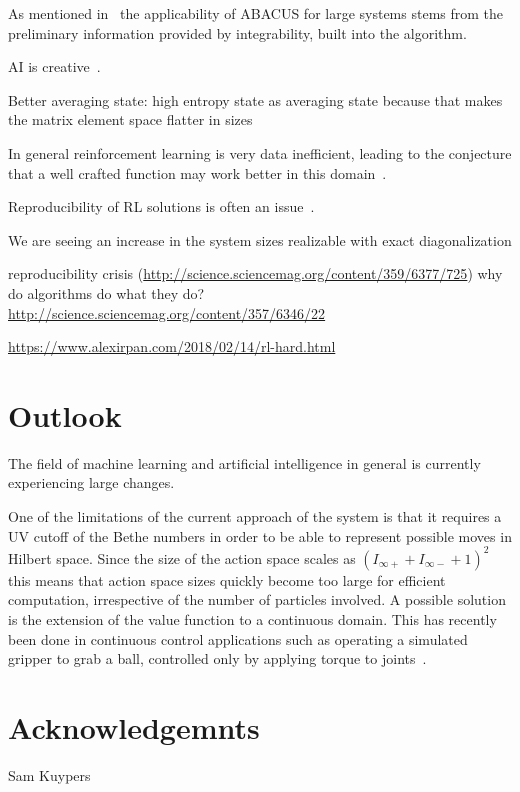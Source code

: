 \documentclass[11pt, a4paper]{report} %
\begin{document}
As mentioned in~\cite{Caux2009} the applicability of ABACUS for large systems stems from the preliminary information provided by integrability, built into the algorithm.

AI is creative~\cite{1803.03453}.

Better averaging state: high entropy state as averaging state because that makes the matrix element space flatter in sizes

In general reinforcement learning is very data inefficient, leading to the conjecture that a well crafted function may work better in this domain~\cite{1710.02298}.

Reproducibility of RL solutions is often an issue~\cite{1709.06560}.

We are seeing an increase in the system sizes realizable with exact diagonalization \cite{wietek18_sublat_codin_algor_distr_memor}

reproducibility crisis (\url{http://science.sciencemag.org/content/359/6377/725})
why do algorithms do what they do? \url{http://science.sciencemag.org/content/357/6346/22}

\url{https://www.alexirpan.com/2018/02/14/rl-hard.html}

\section{Outlook}

The field of machine learning and artificial intelligence in general is currently experiencing large changes.

One of the limitations of the current approach of the system is that it requires a UV cutoff of the Bethe numbers in order to be able to represent possible moves in Hilbert space.
Since the size of the action space scales as \((I_{\infty+} + I_{\infty-} + 1)^2\) this means that action space sizes quickly become too large for efficient computation, irrespective of the number of particles involved.
A possible solution is the extension of the value function to a continuous domain.
This has recently been done in continuous control applications such as operating a simulated gripper to grab a ball, controlled only by applying torque to joints~\cite{lillicrap15_contin_contr_with_deep_reinf_learn}.

\section*{Acknowledgemnts}
Sam Kuypers
\end{document}
